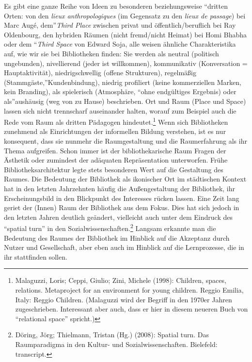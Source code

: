 Es gibt eine ganze Reihe von Ideen zu besonderen beziehungsweise
\enquote{dritten Orten: von den \emph{lieux anthropologiques} (im
Gegensatz zu den \emph{lieux de passage}) bei Marc Augé, dem}\emph{Third
Place} zwischen privat und öffentlich/beruflich bei Ray Oldenbourg, den
hybriden Räumen (nicht fremd/nicht Heimat) bei Homi Bhabha oder dem
\enquote{\emph{Third Space} von Edward Soja, alle weisen ähnliche
Charakteristika auf, wie wir sie bei Bibliotheken finden: Sie werden als
neutral (politisch ungebunden), nivellierend (jeder ist willkommen),
kommunikativ (Konversation = Hauptaktivität), niedrigschwellig (offene
Strukturen), regelmäßig (Stammgäste,}Kundenbindung), niedrig profiliert
(keine kommerziellen Marken, kein Branding), als spielerisch
(Atmosphäre, \enquote{ohne endgültiges Ergebnis) oder als}aushäusig (weg
von zu Hause) beschrieben. Ort und Raum (Place und Space) lassen sich
nicht trennscharf auseinander halten, worauf zum Beispiel auch die Rede
vom Raum als dritten Pädagogen hindeutet.\footnote{Malaguzzi, Loris;
  Ceppi, Giulio; Zini, Michele (1998): Children, spaces, relations.
  Metaproject for an environment for young children. Reggio Emilia,
  Italy: Reggio Children. (Malaguzzi wird der Begriff in den 1970er
  Jahren zugeschrieben. Interessant aber auch, dass er hier in diesem
  neueren Buch von \enquote{relational space} spricht.)} Wenn sich Bibliotheken
zunehmend als Einrichtungen der informellen Bildung verstehen, ist es
nur konsequent, dass sie nunmehr die Raumgestaltung und die
Raumerfahrung als ihr Thema aufgreifen. Schon immer ist der
bibliothekarische Raum Fragen der Ästhetik oder zumindest der adäquaten
Repräsentation unterworfen. Frühe Bibliotheksarchitektur legte stets
besonderen Wert auf die Gestaltung des Raumes. Die Bedeutung der
Bibliothek als ikonischer Ort im städtischen Kontext hat in den letzten
Jahrzehnten häufig die Außengestaltung der Bibliothek, ihr
Erscheinungsbild in den Blickpunkt des Interesses rücken lassen. Eine
Zeit lang geriet der (Innen) Raum der Bibliothek aus dem Fokus. Dies hat
sich jedoch in den letzten Jahren deutlich geändert, vielleicht auch
unter dem Eindruck des \enquote{spatial turn} in den
Sozialwissenschaften.\footnote{Döring, Jörg; Thielmann, Tristan (Hg.)
  (2008): Spatial turn. Das Raumparadigma in den Kultur- und
  Sozialwissenschaften. Bielefeld: transcript.} Langsam erkannte man die
Bedeutung des Raumes der Bibliothek im Hinblick auf die Akzeptanz durch
Nutzer und Gesellschaft, aber eben auch im Hinblick auf die
Lernprozesse, die in ihr stattfinden sollen.

